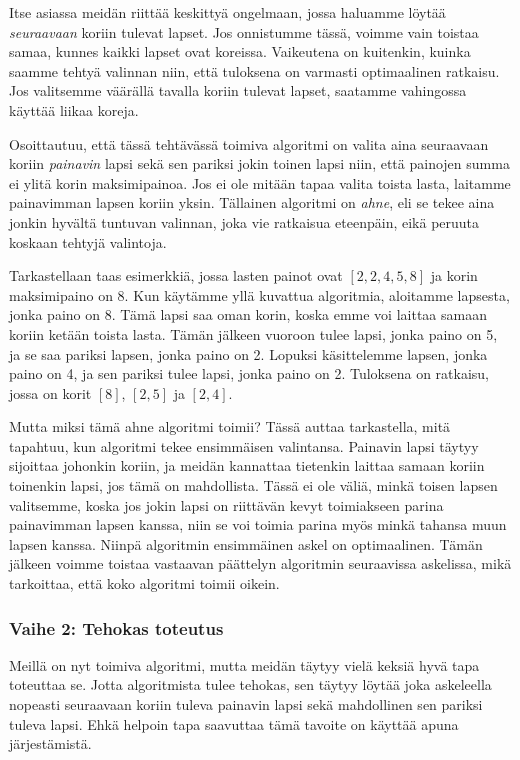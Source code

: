 Itse asiassa meidän riittää keskittyä ongelmaan,
jossa haluamme löytää \emph{seuraavaan} koriin
tulevat lapset.
Jos onnistumme tässä, voimme vain toistaa samaa,
kunnes kaikki lapset ovat koreissa.
Vaikeutena on kuitenkin, kuinka saamme tehtyä valinnan niin,
että tuloksena on varmasti optimaalinen ratkaisu.
Jos valitsemme väärällä tavalla koriin tulevat lapset,
saatamme vahingossa käyttää liikaa koreja.


Osoittautuu, että tässä tehtävässä toimiva algoritmi
on valita aina seuraavaan koriin \emph{painavin} lapsi sekä sen pariksi
jokin toinen lapsi niin, että painojen summa ei ylitä
korin maksimipainoa.
Jos ei ole mitään tapaa valita toista lasta,
laitamme painavimman lapsen koriin yksin.
Tällainen algoritmi on \emph{ahne}, eli se tekee aina jonkin
hyvältä tuntuvan valinnan, joka vie ratkaisua eteenpäin,
eikä peruuta koskaan tehtyjä valintoja.

Tarkastellaan taas esimerkkiä,
jossa lasten painot ovat $[2,2,4,5,8]$
ja korin maksimipaino on 8.
Kun käytämme yllä kuvattua algoritmia,
aloitamme lapsesta, jonka paino on 8.
Tämä lapsi saa oman korin, koska emme voi laittaa
samaan koriin ketään toista lasta.
Tämän jälkeen vuoroon tulee lapsi, jonka paino on 5,
ja se saa pariksi lapsen, jonka paino on 2.
Lopuksi käsittelemme lapsen, jonka paino on 4,
ja sen pariksi tulee lapsi, jonka paino on 2.
Tuloksena on ratkaisu, jossa on korit $[8]$, $[2,5]$ ja $[2,4]$.

Mutta miksi tämä ahne algoritmi toimii?
Tässä auttaa tarkastella, mitä tapahtuu,
kun algoritmi tekee ensimmäisen valintansa.
Painavin lapsi täytyy sijoittaa johonkin koriin,
ja meidän kannattaa tietenkin laittaa samaan koriin toinenkin lapsi,
jos tämä on mahdollista.
Tässä ei ole väliä, minkä toisen lapsen valitsemme,
koska jos jokin lapsi on riittävän kevyt toimiakseen
parina painavimman lapsen kanssa, niin se voi toimia parina
myös minkä tahansa muun lapsen kanssa.
Niinpä algoritmin ensimmäinen askel on optimaalinen.
Tämän jälkeen voimme toistaa vastaavan päättelyn
algoritmin seuraavissa askelissa, mikä tarkoittaa,
että koko algoritmi toimii oikein.

\subsubsection{Vaihe 2: Tehokas toteutus}

Meillä on nyt toimiva algoritmi,
mutta meidän täytyy vielä keksiä hyvä tapa toteuttaa se.
Jotta algoritmista tulee tehokas,
sen täytyy löytää joka askeleella nopeasti seuraavaan
koriin tuleva painavin lapsi sekä mahdollinen sen pariksi tuleva lapsi.
Ehkä helpoin tapa saavuttaa tämä tavoite on käyttää apuna järjestämistä.

